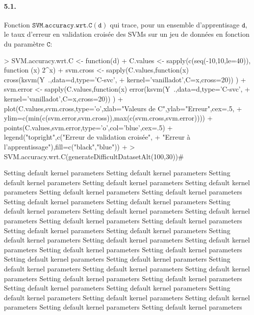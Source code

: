 \documentclass{article}
\begin{document}
\paragraph{5.1.}Fonction $\mathtt{SVM.accuracy.wrt.C(d)}$ qui trace, 
pour un ensemble d'apprentisage $\mathtt{d}$, le taux d'erreur en 
validation croisée des SVMs sur un jeu de données en fonction du 
paramètre $\mathtt{C}$:
\begin{Schunk}
\begin{Sinput}
> SVM.accuracy.wrt.C <- function(d) {
+ 	C.values <- sapply(c(seq(-10,10,le=40)), function (x) 2^x)
+ 	svm.cross <- sapply(C.values,function(x) cross(ksvm(Y~.,data=d,type='C-svc',
+ 			kernel='vanilladot',C=x,cross=20)) )
+ 	svm.error <- sapply(C.values,function(x) error(ksvm(Y~.,data=d,type='C-svc',
+ 			kernel='vanilladot',C=x,cross=20)) ) 
+ 	plot(C.values,svm.cross,type='o',xlab="Valeurs de C",ylab="Erreur",cex=.5,
+ 			ylim=c(min(c(svm.error,svm.cross)),max(c(svm.cross,svm.error))))
+ 	points(C.values,svm.error,type='o',col='blue',cex=.5)
+ 	legend("topright",c("Erreur de validation croisée",
+ 			"Erreur à l'apprentissage"),fill=c("black","blue"))
+ }
> SVM.accuracy.wrt.C(generateDifficultDatasetAlt(100,30))#
\end{Sinput}
\begin{Soutput}
 Setting default kernel parameters  
 Setting default kernel parameters  
 Setting default kernel parameters  
 Setting default kernel parameters  
 Setting default kernel parameters  
 Setting default kernel parameters  
 Setting default kernel parameters  
 Setting default kernel parameters  
 Setting default kernel parameters  
 Setting default kernel parameters  
 Setting default kernel parameters  
 Setting default kernel parameters  
 Setting default kernel parameters  
 Setting default kernel parameters  
 Setting default kernel parameters  
 Setting default kernel parameters  
 Setting default kernel parameters  
 Setting default kernel parameters  
 Setting default kernel parameters  
 Setting default kernel parameters  
 Setting default kernel parameters  
 Setting default kernel parameters  
 Setting default kernel parameters  
 Setting default kernel parameters  
 Setting default kernel parameters  
 Setting default kernel parameters  
 Setting default kernel parameters  
 Setting default kernel parameters  
 Setting default kernel parameters  
 Setting default kernel parameters  
 Setting default kernel parameters  
 Setting default kernel parameters  
 Setting default kernel parameters  
 Setting default kernel parameters  
 Setting default kernel parameters  

\end{Soutput}
\end{Schunk}
\end{document}
